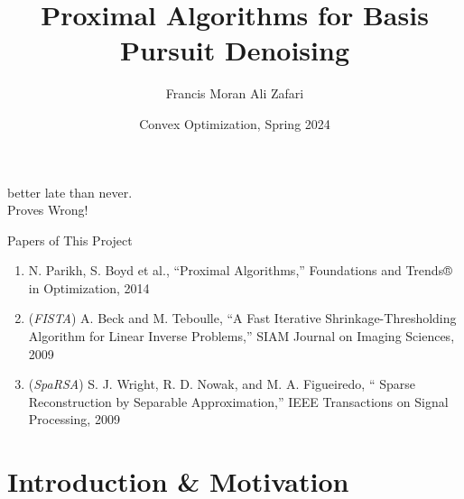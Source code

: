 \documentclass{beamer}
\author{Francis Moran \hspace{15pt} Ali Zafari}
\title{Proximal Algorithms for Basis Pursuit Denoising}
\subtitle{}
\institute{
    Electrical \& Computer Engineering Department\\
    Rutgers University
}
\date{\tiny Convex Optimization, Spring 2024}
\begin{document}
\begin{frame}
    \titlepage
    \vspace*{-0.6cm}
    \begin{figure}[htpb]
        \begin{center}
            
        \end{center}
    \end{figure}
\end{frame}


\begin{frame}{}
    \begin{center}
        better late than never.\\
        \vspace{30pt}
        \pause
        Proves Wrong!
    \end{center}
    
\end{frame}

\begin{frame}{Papers of This Project}
    \begin{enumerate}
        \item N. Parikh, S. Boyd et al., “{\color{rutgerscarlet}Proximal Algorithms},” Foundations and Trends® in Optimization, 2014
        \vspace{10pt}
        \item (\textit{FISTA}) A. Beck and M. Teboulle, “{\color{rutgerscarlet}A Fast Iterative Shrinkage-Thresholding Algorithm for Linear Inverse Problems},” SIAM Journal on Imaging Sciences, 2009
        \vspace{10pt}
        \item (\textit{SpaRSA}) S. J. Wright, R. D. Nowak, and M. A. Figueiredo, “{\color{rutgerscarlet} Sparse Reconstruction by Separable Approximation},” IEEE Transactions on Signal Processing, 2009
    \end{enumerate}
\end{frame}


\begin{frame}    
\tableofcontents[sectionstyle=show,
subsectionstyle=show/shaded/hide,
subsubsectionstyle=show/shaded/hide]
\end{frame}



\section{Introduction \& Motivation}
\end{document}
